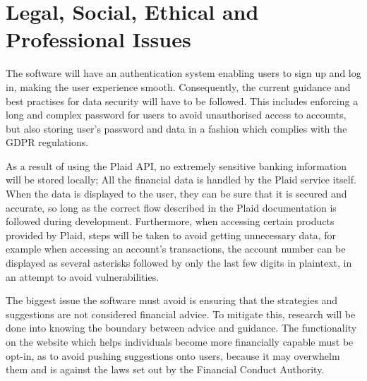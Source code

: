 \section{Legal, Social, Ethical and Professional Issues}
The software will have an authentication system enabling users to sign up and log in, making the user experience smooth. Consequently, the current guidance and best practises for data security will have to be followed. This includes enforcing a long and complex password for users to avoid unauthorised access to accounts, but also storing user's password and data in a fashion which complies with the GDPR regulations.

As a result of using the Plaid API, no extremely sensitive banking information will be stored locally; All the financial data is handled by the Plaid service itself. When the data is displayed to the user, they can be sure that it is secured and accurate, so long as the correct flow described in the Plaid documentation is followed during development. Furthermore, when accessing certain products provided by Plaid, steps will be taken to avoid getting unnecessary data, for example when accessing an account's transactions, the account number can be displayed as several asterisks followed by only the last few digits in plaintext, in an attempt to avoid vulnerabilities.

The biggest issue the software must avoid is ensuring that the strategies and suggestions are not considered financial advice. To mitigate this, research will be done into knowing the boundary between advice and guidance. The functionality on the website which helps individuals become more financially capable must be opt-in, as to avoid pushing suggestions onto users, because it may overwhelm them and is against the laws set out by the Financial Conduct Authority.